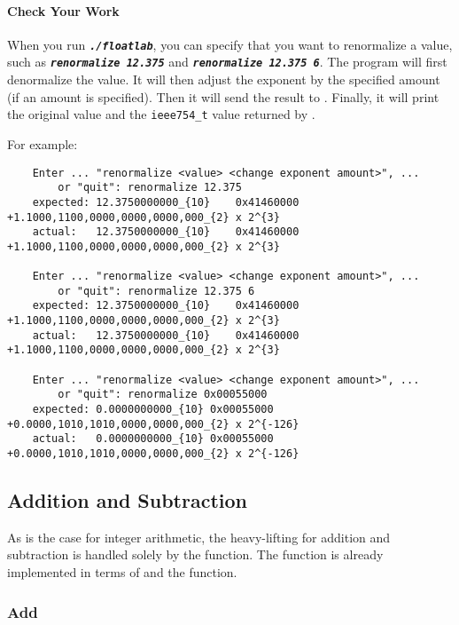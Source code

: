     \paragraph*{Check Your Work}

    When you run \texttt{\textbf{\textit{./floatlab}}}, you can specify that you want to renormalize a value, such as \texttt{\textbf{\textit{renormalize 12.375}}} and \texttt{\textbf{\textit{renormalize 12.375 6}}}.
    The program will first denormalize the value.
    It will then adjust the exponent by the specified amount (if an amount is specified).
    Then it will send the result to .
    Finally, it will print the original value and the \lstinline{ieee754_t} value returned by .

    For example:

    \begin{verbatim}
    Enter ... "renormalize <value> <change exponent amount>", ...
        or "quit": renormalize 12.375
    expected: 12.3750000000_{10}	0x41460000	+1.1000,1100,0000,0000,0000,000_{2} x 2^{3}
    actual:   12.3750000000_{10}	0x41460000	+1.1000,1100,0000,0000,0000,000_{2} x 2^{3}

    Enter ... "renormalize <value> <change exponent amount>", ...
        or "quit": renormalize 12.375 6
    expected: 12.3750000000_{10}	0x41460000	+1.1000,1100,0000,0000,0000,000_{2} x 2^{3}
    actual:   12.3750000000_{10}	0x41460000	+1.1000,1100,0000,0000,0000,000_{2} x 2^{3}

    Enter ... "renormalize <value> <change exponent amount>", ...
        or "quit": renormalize 0x00055000
    expected: 0.0000000000_{10}	0x00055000	+0.0000,1010,1010,0000,0000,000_{2} x 2^{-126}
    actual:   0.0000000000_{10}	0x00055000	+0.0000,1010,1010,0000,0000,000_{2} x 2^{-126}
    \end{verbatim}

    \subsection{Addition and Subtraction}

    As is the case for integer arithmetic, the heavy-lifting for addition and subtraction is handled solely by the  function.
    The  function is already implemented in terms of  and the  function.

    \subsubsection{Add}

